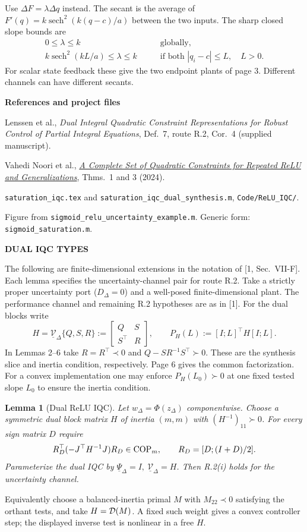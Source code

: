\documentclass[11pt,a4paper]{article}
\newcommand{\topic}[2]{{\color{accent}\small\bfseries #1}\par\vspace{1mm}{\color{ink}\LARGE\bfseries #2}\par\vspace{2mm}}
\newtheorem{lema}{Lemma}
\begin{document}
Use \(\Delta F=\lambda\Delta q\) instead. The secant is the average of
\(F'(q)=k\operatorname{sech}^2(k(q-c)/a)\) between the two inputs. The sharp closed slope bounds are
\[
\begin{aligned}
 0\le\lambda\le k &\qquad\text{globally},\\
 k\operatorname{sech}^2(kL/a)\le\lambda\le k
 &\qquad\text{if both } |q_i-c|\le L,\quad L>0 .
\end{aligned}
\]
For scalar state feedback these give the two endpoint plants of page 3.
Different channels can have different secants.
\vfill
{\footnotesize\color{ink}\textbf{References and project files}\par
[1] Lenssen et al., \emph{Dual Integral Quadratic Constraint Representations for Robust Control of Partial Integral Equations}, Def.~7, route R.2, Cor.~4 (supplied manuscript).\par
[2] Vahedi Noori et al., \href{https://arxiv.org/abs/2407.06888}{\emph{A Complete Set of Quadratic Constraints for Repeated ReLU and Generalizations}}, Thms.~1 and 3 (2024).\par
[3] \texttt{saturation\_iqc.tex} and \texttt{saturation\_iqc\_dual\_synthesis.m}, \texttt{Code/ReLU\_IQC/}.\par
[4] Figure from \texttt{sigmoid\_relu\_uncertainty\_example.m}. Generic form: \texttt{sigmoid\_saturation.m}.}
\newpage\normalsize
\topic{DUAL IQC TYPES}{Plant-side IQCs for ReLU and saturation}
The following are finite-dimensional extensions in the notation of [1, Sec.~VII-F]. Each lemma specifies the uncertainty-channel pair for route R.2. Take a strictly proper uncertainty port (\(D_\Delta=0\)) and a well-posed finite-dimensional plant. The performance channel and remaining R.2 hypotheses are as in [1]. For the dual blocks write
\[
 H=\underline{\mathcal V}_\Delta\{Q,S,R\}:=
 \begin{bmatrix}Q&S\\S^\top&R\end{bmatrix},\qquad
 P_H(L):=[I;L]^\top H[I;L].
\]
In Lemmas 2--6 take \(R=R^\top\prec0\) and \(Q-SR^{-1}S^\top\succ0\). These are the synthesis slice and inertia condition, respectively. Page 6 gives the common factorization. For a convex implementation one may enforce \(P_H(L_0)\succ0\) at one fixed tested slope \(L_0\) to ensure the inertia condition.

\begin{lema}[Dual ReLU IQC]
Let \(w_\Delta=\Phi(z_\Delta)\) componentwise. Choose a symmetric dual block matrix \(H\) of inertia \((m,m)\) with \((H^{-1})_{11}\succ0\). For every sign matrix \(D\) require
\[
 R_D^\top(-J^\top H^{-1}J)R_D\in\mathrm{COP}_m,\qquad R_D=[D;(I+D)/2].
\]
Parameterize the dual IQC by \(\underline\Psi_\Delta=I,\ \underline{\mathcal V}_\Delta=H\). Then R.2(i) holds for the uncertainty channel.
\end{lema}
Equivalently choose a balanced-inertia primal \(M\) with \(M_{22}\prec0\) satisfying the orthant tests, and take \(H=\mathcal D(M)\). A fixed such weight gives a convex controller step; the displayed inverse test is nonlinear in a free \(H\).
\end{document}
